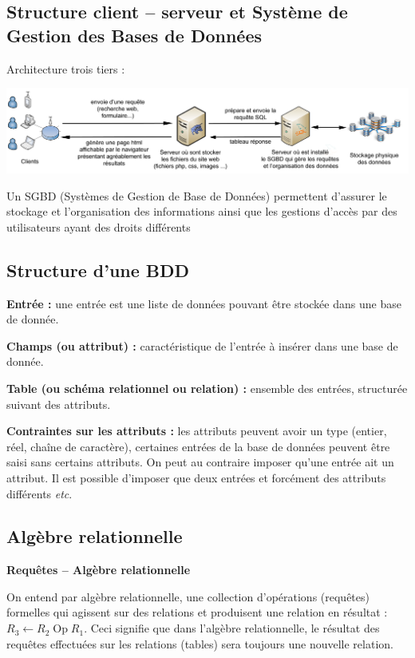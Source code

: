\documentclass[10pt,fleqn]{article} %
\begin{document}

\vspace{2cm}
\pagestyle{fancy}
\thispagestyle{plain}


\subsection*{Structure client -- serveur et Système de Gestion des Bases de Données}

Architecture trois tiers : 
\begin{center}
\includegraphics[width=.9\textwidth]{images/bdd}
\end{center}
Un SGBD (Systèmes de Gestion de Base de Données) permettent d'assurer le stockage et l'organisation des informations ainsi que les gestions d'accès par des utilisateurs ayant des droits différents

\subsection*{Structure d'une BDD}
\begin{defi}
\textbf{Entrée :} une entrée est une liste de données pouvant être stockée dans une base de donnée. 

\textbf{Champs (ou attribut) :} caractéristique de l'entrée à insérer dans une base de donnée. 

\textbf{Table (ou schéma relationnel ou relation) :} ensemble des entrées, structurée suivant des attributs.

\textbf{Contraintes sur les attributs : } les attributs peuvent avoir un type (entier, réel, chaîne de caractère), certaines entrées de la base de données peuvent être saisi sans certains attributs. On peut au contraire imposer qu'une entrée ait un attribut. Il est possible d'imposer que deux entrées et forcément des attributs différents \textit{etc}.
\end{defi}


\subsection*{Algèbre relationnelle}


\begin{defi}
\textbf{Requêtes -- Algèbre relationnelle}

On entend par algèbre relationnelle, une collection d'opérations (requêtes) formelles qui agissent sur des relations et produisent une relation en résultat : $R_3 \leftarrow R_2 \;  \text{Op} \;  R_1$. Ceci signifie que dans l'algèbre relationnelle, le résultat des requêtes effectuées sur les relations (tables) sera toujours une nouvelle relation. 
\end{defi}
\end{document}
